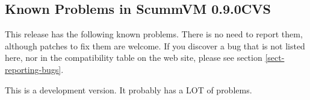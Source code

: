 

\subsection{Known Problems in ScummVM 0.9.0CVS}

This release has the following known problems. There is no need to report them,
although patches to fix them are welcome. If you discover a bug that is not
listed here, nor in the compatibility table on the web site, please see
section \ref{sect-reporting-bugs}.

This is a development version. It probably has a LOT of problems. 
